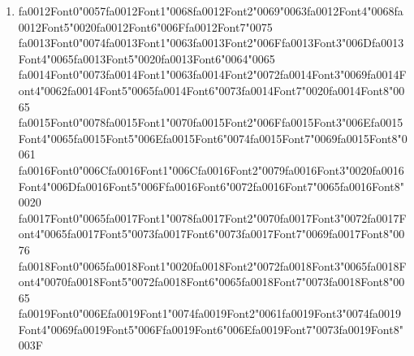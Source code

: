 \documentclass[12pt]{article}
\begin{document}
\begin{enumerate}[label=Q\arabic*.]
 \item {\csname fa0012Font0\endcsname\char"0057}{\csname fa0012Font1\endcsname\char"0068}{\csname fa0012Font2\endcsname\char"0069}{\char"0063}{\csname fa0012Font4\endcsname\char"0068}{\csname fa0012Font5\endcsname\char"0020}{\csname fa0012Font6\endcsname\char"006F}{\csname fa0012Font7\endcsname\char"0075} {\csname fa0013Font0\endcsname\char"0074}{\csname fa0013Font1\endcsname\char"0063}{\csname fa0013Font2\endcsname\char"006F}{\csname fa0013Font3\endcsname\char"006D}{\csname fa0013Font4\endcsname\char"0065}{\csname fa0013Font5\endcsname\char"0020}{\csname fa0013Font6\endcsname\char"0064}{\char"0065} {\csname fa0014Font0\endcsname\char"0073}{\csname fa0014Font1\endcsname\char"0063}{\csname fa0014Font2\endcsname\char"0072}{\csname fa0014Font3\endcsname\char"0069}{\csname fa0014Font4\endcsname\char"0062}{\csname fa0014Font5\endcsname\char"0065}{\csname fa0014Font6\endcsname\char"0073}{\csname fa0014Font7\endcsname\char"0020}{\csname fa0014Font8\endcsname\char"0065} {\csname fa0015Font0\endcsname\char"0078}{\csname fa0015Font1\endcsname\char"0070}{\csname fa0015Font2\endcsname\char"006F}{\csname fa0015Font3\endcsname\char"006E}{\csname fa0015Font4\endcsname\char"0065}{\csname fa0015Font5\endcsname\char"006E}{\csname fa0015Font6\endcsname\char"0074}{\csname fa0015Font7\endcsname\char"0069}{\csname fa0015Font8\endcsname\char"0061} {\csname fa0016Font0\endcsname\char"006C}{\csname fa0016Font1\endcsname\char"006C}{\csname fa0016Font2\endcsname\char"0079}{\csname fa0016Font3\endcsname\char"0020}{\csname fa0016Font4\endcsname\char"006D}{\csname fa0016Font5\endcsname\char"006F}{\csname fa0016Font6\endcsname\char"0072}{\csname fa0016Font7\endcsname\char"0065}{\csname fa0016Font8\endcsname\char"0020} {\csname fa0017Font0\endcsname\char"0065}{\csname fa0017Font1\endcsname\char"0078}{\csname fa0017Font2\endcsname\char"0070}{\csname fa0017Font3\endcsname\char"0072}{\csname fa0017Font4\endcsname\char"0065}{\csname fa0017Font5\endcsname\char"0073}{\csname fa0017Font6\endcsname\char"0073}{\csname fa0017Font7\endcsname\char"0069}{\csname fa0017Font8\endcsname\char"0076} {\csname fa0018Font0\endcsname\char"0065}{\csname fa0018Font1\endcsname\char"0020}{\csname fa0018Font2\endcsname\char"0072}{\csname fa0018Font3\endcsname\char"0065}{\csname fa0018Font4\endcsname\char"0070}{\csname fa0018Font5\endcsname\char"0072}{\csname fa0018Font6\endcsname\char"0065}{\csname fa0018Font7\endcsname\char"0073}{\csname fa0018Font8\endcsname\char"0065} {\csname fa0019Font0\endcsname\char"006E}{\csname fa0019Font1\endcsname\char"0074}{\csname fa0019Font2\endcsname\char"0061}{\csname fa0019Font3\endcsname\char"0074}{\csname fa0019Font4\endcsname\char"0069}{\csname fa0019Font5\endcsname\char"006F}{\csname fa0019Font6\endcsname\char"006E}{\csname fa0019Font7\endcsname\char"0073}{\csname fa0019Font8\endcsname\char"003F}

\end{enumerate}
\end{document}
